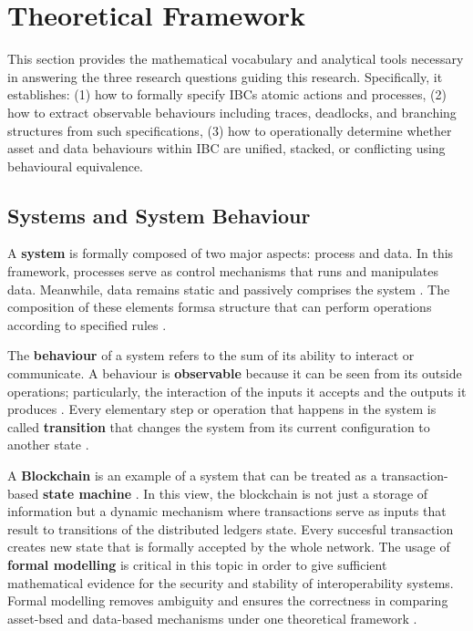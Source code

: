 \chapter{Theoretical Framework}\label{theoretical-framework}

This section provides the mathematical vocabulary and analytical tools
necessary in answering the three research questions guiding this
research. Specifically, it establishes: (1) how to formally specify
IBC\textquotesingle s atomic actions and processes, (2) how to extract
observable behaviours including traces, deadlocks, and branching
structures from such specifications, (3) how to operationally determine
whether asset and data behaviours within IBC are unified, stacked, or
conflicting using behavioural equivalence.

\section{Systems and System
Behaviour}\label{systems-and-system-behaviour}

A \textbf{system} is formally composed of two major aspects: process and
data. In this framework, processes serve as control mechanisms that runs
and manipulates data. Meanwhile, data remains static and passively
comprises the system \citep{fokkink2007introduction}. The composition of
these elements formsa structure that can perform operations according to
specified rules \citep{plotkin2004structural}.

The \textbf{behaviour} of a system refers to the sum of its ability to
interact or communicate. A behaviour is \textbf{observable} because it
can be seen from its outside operations; particularly, the interaction
of the inputs it accepts and the outputs it produces
\citep{milner1989communication}. Every elementary step or operation that
happens in the system is called \textbf{transition} that changes the
system from its current configuration to another state
\citep{plotkin2004structural}.

A \textbf{Blockchain} is an example of a system that can be treated as a
transaction-based \textbf{state machine} \citep{wood2021ethereum}. In
this view, the blockchain is not just a storage of information but a
dynamic mechanism where transactions serve as inputs that result to
transitions of the distributed ledger\textquotesingle s state. Every
succesful transaction creates new state that is formally accepted by the
whole network. The usage of \textbf{formal modelling} is critical in
this topic in order to give sufficient mathematical evidence for the
security and stability of interoperability systems. Formal modelling
removes ambiguity and ensures the correctness in comparing asset-bsed
and data-based mechanisms under one theoretical framework
\citep{Duan2018} \citep{fokkink2007introduction}.

